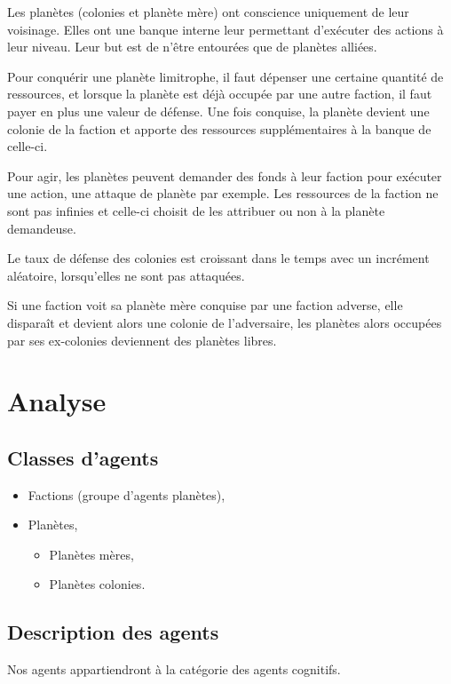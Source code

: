 \documentclass{article}
\begin{document}
    Les planètes (colonies et planète mère) ont conscience uniquement de leur voisinage. Elles ont une banque interne leur permettant d'exécuter des actions à leur niveau. Leur but est de n'être entourées que de planètes alliées.
	
    Pour conquérir une planète limitrophe, il faut dépenser une certaine quantité de ressources, et lorsque la planète est déjà occupée par une autre faction, il faut payer en plus une valeur de défense. Une fois conquise, la planète devient une colonie de la faction et apporte des ressources supplémentaires à la banque de celle-ci.
	
    Pour agir, les planètes peuvent demander des fonds à leur faction pour exécuter une action, une attaque de planète par exemple. Les ressources de la faction ne sont pas infinies et celle-ci choisit de les attribuer ou non à la planète demandeuse.

    Le taux de défense des colonies est croissant dans le temps avec un incrément aléatoire, lorsqu'elles ne sont pas attaquées. 
	
    Si une faction voit sa planète mère conquise par une faction adverse, elle disparaît et devient alors une colonie de l'adversaire, les planètes alors occupées par ses ex-colonies deviennent des planètes libres. 

  \section{Analyse}
    \subsection{Classes d'agents}
      \begin{itemize}
        \item Factions (groupe d'agents planètes),
        \item Planètes,
        \begin{itemize}
          \item Planètes mères,
          \item Planètes colonies.
        \end{itemize}
      \end{itemize}

    \subsection{Description des agents}
      Nos agents appartiendront à la catégorie des agents cognitifs. 
\end{document}
